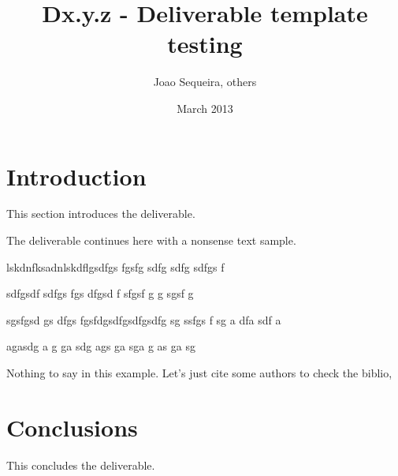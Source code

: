 \documentclass[]{monarch_deliverable}				%
\begin{document}
%
\title{Dx.y.z - Deliverable template testing}

%

\author{Joao Sequeira, others}

\date{March 2013}

\maketitle

\tableofcontents


\section{Introduction}

This section introduces the deliverable.

\newpage

The deliverable continues here with a nonsense text sample.

\newpage

lskdnfksadnlskdflgsdfgs fgsfg sdfg sdfg sdfgs f

sdfgsdf sdfgs fgs dfgsd f sfgsf g  g sgsf g

sgsfgsd gs dfgs fgsfdgsdfgsdfgsdfg sg ssfgs f sg a dfa sdf a


agasdg a g ga sdg ags ga sga g as ga sg


Nothing to say in this example. Let's just cite some authors to check the biblio,
\cite{Bertsekas:1999, Astrom.Wittenmark:1984,Sadowska.et.al:2011}

\section{Conclusions}

This concludes the deliverable.




\printindex
\end{document}
